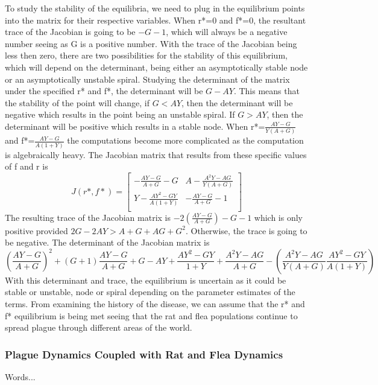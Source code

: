 \documentclass [letterpaper, 12pt] {article}
\begin{document}
To study the stability of the equilibria, we need to plug in the equilibrium points
into the matrix for their respective variables. When r*=0 and f*=0, the resultant trace
of the Jacobian is going to be $-G-1$, which will always be a negative number seeing as G is a positive number. 
With the trace of the Jacobian being less then zero, there are two
possibilities for the stability of this equilibrium, which will depend on the determinant, being either an
asymptotically stable node or an asymptotically unstable spiral. Studying the determinant of the matrix
under the specified r* and f*, the determinant will be $G-AY$. This means that the stability of the point
will change, if $G<AY$, then the determinant will be negative which results in the point being an unstable
spiral. If $G>AY$, then the determinant will be positive which results in a stable node. When 
r*=$\frac{AY-G}{Y(A+G)}$ and f*=$\frac{AY-G}{A(1+Y)}$ the computations become more
complicated as the computation is algebraically heavy. The Jacobian matrix that results
from these specific values of f and r is
\begin{equation}
J(r*, f*)=
\begin{bmatrix}
-\frac{AY-G}{A+G}-G & A-\frac{A^{2}Y-AG}{Y(A+G)} \\
Y-\frac{AY^{2}-GY}{A(1+Y)} & -\frac{AY-G}{A+G}-1 \\
\end{bmatrix}
\end{equation}
The resulting trace of the Jacobian matrix is $-2(\frac{AY-G}{A+G})-G-1$ which is only positive
provided $2G-2AY>A+G+AG+G^{2}$. Otherwise, the trace is going to be negative. The determinant
of the Jacobian matrix is $$(\frac{AY-G}{A+G})^{2} + (G+1)\frac{AY-G}{A+G}+G-AY+\frac{AY^{2}-GY}{1+Y} + \frac{A^{2}Y-AG}{A+G}-(\frac{A^{2}Y-AG}{Y(A+G)}\frac{AY^{2}-GY}{A(1+Y)})$$
With this determinant and trace, the equilibrium is uncertain as it could be stable or unstable, node or spiral
depending on the parameter estimates of the terms. From examining the history of the disease,
we can assume that the r* and f* equilibrium is being met seeing that the rat and flea
populations continue to spread plague through different areas of the world.

\pagebreak

\subsubsection{Plague Dynamics Coupled with Rat and Flea Dynamics}

Words...
\end{document}
